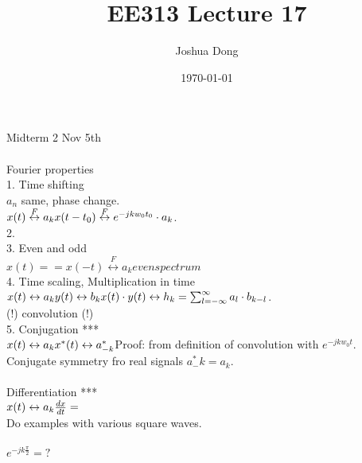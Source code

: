 \documentclass{article}
\begin{document}
\title{EE313\: Lecture 17}
\author{Joshua Dong}
\date{\today}
\maketitle

Midterm 2 Nov 5th
\\
\\Fourier properties
\\1. Time shifting
\\$a_n$ same, phase change.
\\$x(t) \overset{F}\leftrightarrow a_k
\\x(t-t_0) \overset{F}\leftrightarrow e^{-jkw_0t_0} \cdot a_k$.
\\2.
\\3. Even and odd
\\$x(t) == x(-t) \overset{F}\leftrightarrow a_k even spectrum$
\\4. Time scaling, Multiplication in time
\\$x(t) \leftrightarrow a_k
\\y(t) \leftrightarrow b_k
\\x(t) \cdot y(t) \leftrightarrow h_k =
\sum_{l=-\infty}^{\infty} a_l \cdot b_{k-l}$.
\\(!) convolution (!)
\\5. Conjugation ***
\\$x(t) \leftrightarrow a_k
\\x^*(t) \leftrightarrow a^*_{-k}
\\$Proof: from definition of convolution with $e^{-jkw_0t}$.
\\Conjugate symmetry fro real signals $a^*_-k = a_k$.
\\
\\Differentiation ***
\\$x(t) \leftrightarrow a_k
\\\frac{dx}{dt} = 
\\$
\\Do examples with various square waves.
\\
\\$e^{-jk\frac{\pi}{2}} = ?$
\end{document}
